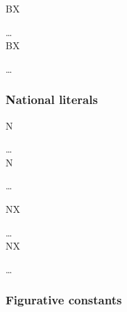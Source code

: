 \begin{syntax}
  \begin{1=}
    BX\textquotesingle
    \begin{0-1}
      \hexcharacter
    \end{0-1}\ldots
    \textquotesingle \\
    
    BX\textquotedbl
    \begin{0-1}
      \hexcharacter
    \end{0-1}\ldots
    \textquotedbl
  \end{1=}
\end{syntax}

\subsubsection{National literals}

\begin{syntax}
  \begin{1=}
    N\textquotesingle
    \begin{0-1}
      \character
    \end{0-1}\ldots
    \textquotesingle \\
    
    N\textquotedbl
    \begin{0-1}
      \character
    \end{0-1}\ldots
    \textquotedbl
  \end{1=}
\end{syntax}

\begin{syntax}
  \begin{1=}
    NX\textquotesingle
    \begin{0-1}
      \hexcharacter
    \end{0-1}\ldots
    \textquotesingle \\
    
    NX\textquotedbl
    \begin{0-1}
      \hexcharacter
    \end{0-1}\ldots
    \textquotedbl
  \end{1=}  
\end{syntax}

\subsubsection{Figurative constants}


